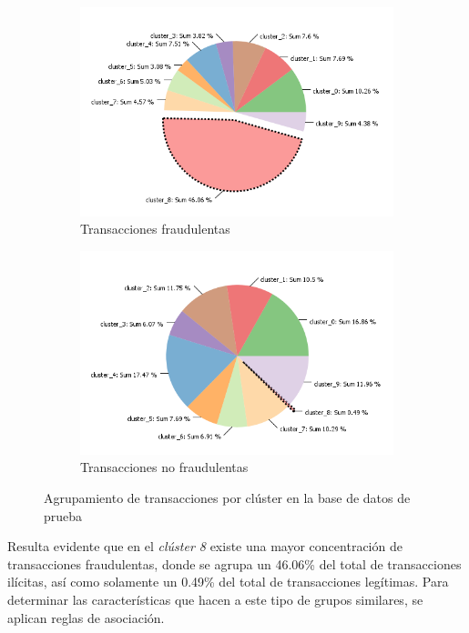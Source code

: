 \begin{figure} [H]
	\centering
	\begin{subfigure}[b]{0.45 \linewidth}
		\includegraphics[width=\linewidth]{"figuras/Jenn/cluster asigned (1)"}
		\caption{Transacciones fraudulentas}
		\label{fig:cluster-en-test-1}		
	\end{subfigure}
	\begin{subfigure}[b]{0.45 \linewidth}
		\includegraphics[width=\linewidth]{"figuras/Jenn/cluster asigned (2)"}
		\caption{Transacciones no fraudulentas}
		\label{fig:cluster-en-test-2}		
	\end{subfigure}
	\caption{Agrupamiento de transacciones por clúster en la base de datos de prueba}
	\label{fig:cluster-test}
\end{figure}

Resulta evidente que en el \emph{clúster 8} existe una mayor concentración de transacciones fraudulentas, donde se agrupa un 46.06\% del total de transacciones ilícitas, así como solamente un 0.49\% del total de transacciones legítimas. Para determinar las características que hacen a este tipo de grupos similares, se aplican reglas de asociación.

